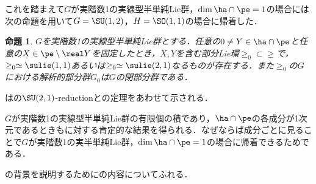 \documentclass[12pt,dvipdfmx,uplatex]{jsarticle}
\newcounter{countabst}
\newtheorem{prop-a}[countabst]{命題}
\begin{document}
これを踏まえて$G$が実階数1の実線型半単純Lie群，$\dim \ha\cap\pe =1 $の場合には次の命題を用いて$G = \SU(1,2) $，$H= \SO(1,1)$の場合に帰着した．

\begin{prop-a}\label{prop:reduction}
  $G$を実階数1の実線型半単純Lie群とする．任意の$0\neq Y\in \ha\cap\pe $と任意の$X\in \pe\setminus \real Y$を固定したとき，$X,Y$を含む部分Lie環$\ge_0\subset \ge$で，$\ge_0\simeq \sulie(1,1) $あるいは$\ge_0\simeq \sulie(2,1)$なるものが存在する．また$\ge_0$の$G$における解析的部分群$G_0$は$G$の閉部分群である．
\end{prop-a}
\vspace{-0.5em}
は\cite[p.~409]{hel01}の{$\SU(2,1) $-reduction}と\cite{yos38}の定理をあわせて示される．

$G$が実階数1の実線型半単純Lie群の有限個の積であり，$\ha\cap \pe $の各成分が1次元であるときもに対する肯定的な結果を得られる．なぜならば成分ごとに見ることで$G$が実階数1の実半単純Lie群，$\dim \ha\cap\pe =1 $の場合に帰着できるためである．

の背景を説明するために\cite{ber88}の内容についてふれる．
\end{document}
